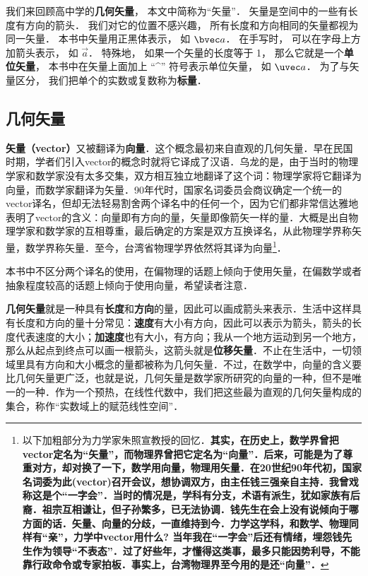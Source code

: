 
我们来回顾高中学的\textbf{几何矢量}， 本文中简称为“矢量”． 矢量是空间中的一些有长度有方向的箭头． 我们对它的位置不感兴趣， 所有长度和方向相同的矢量都视为同一矢量． 本书中矢量用正黑体表示， 如 $\bvec a$． 在手写时， 可以在字母上方加箭头表示， 如 $\overrightarrow{a}$． 特殊地， 如果一个矢量的长度等于 1， 那么它就是一个\textbf{单位矢量}， 本书中在矢量上面加上 “\^{}” 符号表示单位矢量， 如 $\uvec a$． 为了与矢量区分， 我们把单个的实数或复数称为\textbf{标量}．

\subsection{几何矢量}

\textbf{矢量（vector）}又被翻译为\textbf{向量}．这个概念最初来自直观的几何矢量．早在民国时期，学者们引入vector的概念时就将它译成了汉语．乌龙的是，由于当时的物理学家和数学家没有太多交集，双方相互独立地翻译了这个词：物理学家将它翻译为向量，而数学家翻译为矢量．90年代时，国家名词委员会商议确定一个统一的vector译名，但却无法轻易割舍两个译名中的任何一个，因为它们都非常信达雅地表明了vector的含义：向量即有方向的量，矢量即像箭矢一样的量．大概是出自物理学家和数学家的互相尊重，最后确定的方案是双方互换译名，从此物理学界称矢量，数学界称矢量．至今，台湾省物理学界依然将其译为向量\footnote{以下加粗部分为力学家朱照宣教授的回忆．\textbf{其实，在历史上，数学界曾把vector定名为“矢量”，而物理界曾把它定名为“向量”．后来，可能是为了尊重对方，却对换了一下，数学用向量，物理用矢量．在20世纪90年代初，国家名词委为此(vector)召开会议，想协调双方，由主任钱三强亲自主持．我曾戏称这是个“一字会”．当时的情况是，学科有分支，术语有派生，犹如家族有后裔．祖宗互相谦让，但子孙繁多，已无法协调．钱先生在会上没有说倾向于哪方面的话．矢量、向量的分歧，一直维持到今．力学这学科，和数学、物理同样有“亲”，力学中vector用什么? 当年我在“一字会”后还有情绪，埋怨钱先生作为领导“不表态”．过了好些年，才懂得这类事，最多只能因势利导，不能靠行政命令或专家拍板．事实上，台湾物理界至今用的是还“向量”．}   }．

本书中不区分两个译名的使用，在偏物理的话题上倾向于使用矢量，在偏数学或者抽象程度较高的话题上倾向于使用向量，希望读者注意．

\textbf{几何矢量}就是一种具有\textbf{长度}和\textbf{方向}的量，因此可以画成箭头来表示．生活中这样具有长度和方向的量十分常见：\textbf{速度}有大小有方向，因此可以表示为箭头，箭头的长度代表速度的大小；\textbf{加速度}也有大小，有方向；我从一个地方运动到另一个地方，那么从起点到终点可以画一根箭头，这箭头就是\textbf{位移矢量}．不止在生活中，一切领域里具有方向和大小概念的量都被称为几何矢量．不过，在数学中，向量的含义要比几何矢量更广泛，也就是说，几何矢量是数学家所研究的向量的一种，但不是唯一的一种．作为一个预热，在线性代数中，我们把这些最为直观的几何矢量构成的集合，称作“实数域上的赋范线性空间”．

